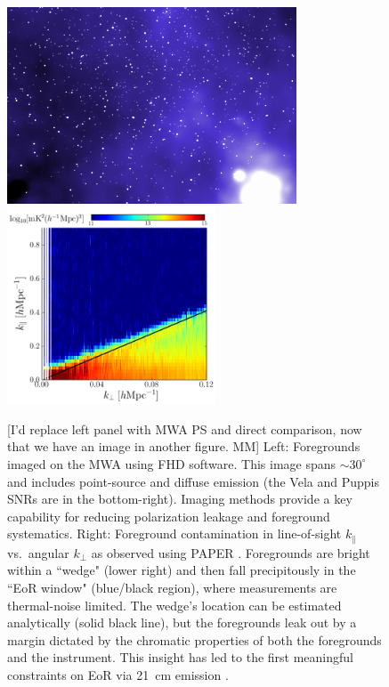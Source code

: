 \documentclass[preprint]{aastex}
\def\kperp{k_{\bot}}
\def\kpar{k_{\|}}
\def\kperp{k_{\bot}}
\def\kpar{k_{\|}}
\begin{document}
\begin{figure}[!ht] \centering
\includegraphics[height=2.3in]{plots/MWApretty_crop.png} 
\includegraphics[height=2.3in]{plots/wedge_tall_wide.png} \caption{\small [I'd replace left panel with MWA PS and direct comparison, now that we have an image in another figure. MM] Left:
Foregrounds imaged on the MWA using FHD software.
This image spans $\sim$$30^{\circ}$ and
includes point-source and diffuse emission (the Vela and Puppis SNRs are in the
bottom-right). Imaging methods provide a key capability for reducing
polarization leakage and foreground systematics.  
Right: Foreground contamination in line-of-sight $\kpar$ vs.\ angular $\kperp$
as observed using PAPER \citep{pober_et_al2013}.
Foregrounds are bright within a ``wedge" (lower right) and then fall 
precipitously in the ``EoR window" (blue/black 
region), where measurements are thermal-noise limited.  The wedge's location can 
be estimated analytically (solid black line), but the foregrounds leak out by a margin 
dictated by the chromatic properties of both the foregrounds and the instrument.
This insight has led to the
first meaningful constraints on EoR via 21~cm emission
\citep{parsons_et_al2013}.
}\label{fig:twoFGViews} \end{figure}
\end{document}
